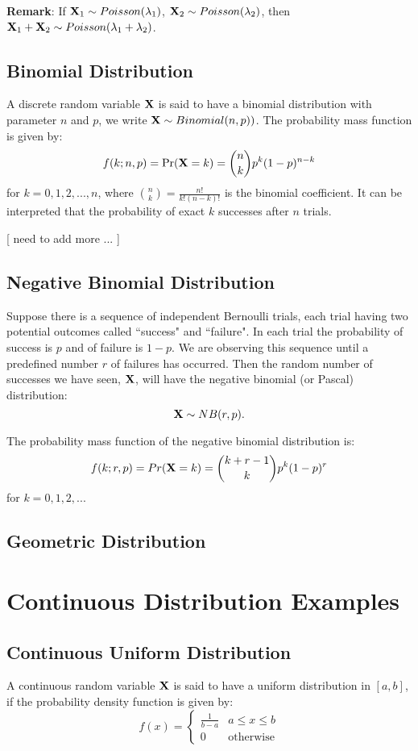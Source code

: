 \documentclass[11pt]{article}
\def\X{{\bf X}}
\begin{document}
{\bf Remark}: If $\X_1 \sim Poisson(\lambda_1)$, $\X_2 \sim Poisson(\lambda_2)$, 
then $\X_1 + \X_2 \sim Poisson(\lambda_1 + \lambda_2)$.

\subsection{Binomial Distribution}
A discrete random variable $\X$ is said to have a binomial distribution with parameter $n$ and $p$, we write $\X \sim Binomial(n,p))$. The probability mass function is given by:
\[f(k;n,p) = \Pr(\X = k) = {n\choose k}p^k(1-p)^{n-k}\]
for $k=0,1,2,...,n$, where ${n \choose k} = \frac{n!}{k!(n-k)!}$ is the binomial coefficient. It can be interpreted that the probability of exact $k$ successes after $n$ trials.

[ need to add more ... ]

\subsection{Negative Binomial Distribution}
Suppose there is a sequence of independent Bernoulli trials, each trial having two potential outcomes called ``success" and ``failure". In each trial the probability of success is $p$ and of failure is $1 − p$. We are observing this sequence until a predefined number $r$ of failures has occurred. Then the random number of successes we have seen, $\X$, will have the negative binomial (or Pascal) distribution:
\[\X \sim NB(r, p).\]

The probability mass function of the negative binomial distribution is:
\[f(k; r,p) = Pr(\X = k) = {k+r-1 \choose k} p^k (1-p)^r\]
for $k = 0, 1, 2, ...$

\subsection{Geometric Distribution}


\section{Continuous Distribution Examples}
\subsection{Continuous Uniform Distribution}
A continuous random variable $\X$ is said to have a uniform distribution in $[a,b]$, 
if the probability density function is given by:
\[ f(x)=\begin{cases}
  \frac{1}{b - a} &  a \leq x \leq b \\
  0 & \mathrm{otherwise}
  \end{cases} \]
  
\end{document}
